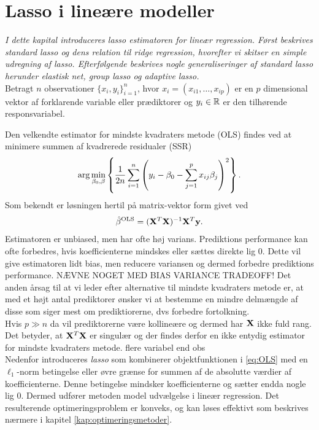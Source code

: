 \chapter{Lasso i lineære modeller}
\textit{I dette kapital introduceres lasso estimatoren for lineær regression. 
Først beskrives standard lasso og dens relation til ridge regression, hvorefter vi skitser en simple udregning af lasso.
Efterfølgende beskrives nogle generaliseringer af standard lasso herunder elastisk net, group lasso og adaptive lasso.} \\[4mm]
%
Betragt \(n\) observationer \(\{x_i, y_i\}_{i=1}^n \), hvor $x_i=(x_{i1}, \ldots, x_{ip})$ er en $p$ dimensional vektor af forklarende variable eller prædiktorer og $y_i \in \mathbb{R}$ er den tilhørende responsvariabel.

Den velkendte estimator for mindste kvadraters metode (OLS) findes ved at minimere summen af kvadrerede residualer (SSR)
\begin{align}
\arg \min_{\beta_0, \beta} \cbr{\frac{1}{2n} \sum_{i=1}^n \del{y_i - \beta_0 - \sum_{j=1}^p x_{ij} \beta_j}^2}. \label{eq:OLS}
\end{align}
Som bekendt er løsningen hertil på matrix-vektor form givet ved
\begin{align*}
\hat{\beta}^{\text{OLS}} = (\mathbf{X}^T \mathbf{X})^{-1} \mathbf{X}^T \mathbf{y}.
\end{align*}
Estimatoren er unbiased, men har ofte høj varians. 
Prediktions performance kan ofte forbedres, hvis koefficienterne mindskes eller sættes direkte lig 0.
Dette vil give estimatoren lidt bias, men reducere variansen og dermed forbedre prediktions performance. NÆVNE NOGET MED BIAS VARIANCE TRADEOFF!
Det anden årsag til at vi leder efter alternative til mindste kvadraters metode er, at med et højt antal prediktorer ønsker vi at bestemme en mindre delmængde af disse som siger mest om prediktiorerne, dvs forbedre fortolkning.\\[4mm]

Hvis \(p \gg n\) da vil prediktorerne være kollineære og dermed har \(\mathbf{X}\) ikke fuld rang.
Det betyder, at $\mathbf{X}^T \mathbf{X}$ er singulær og der findes derfor en ikke entydig estimator for mindste kvadraters metode.
flere variabel end obs \\[4mm]
%
Nedenfor introduceres \textit{lasso} som kombinerer objektfunktionen i \eqref{eq:OLS} med en $\ell_1$-norm betingelse eller øvre grænse for summen af de absolutte værdier af koefficienterne.
Denne betingelse mindsker koefficienterne og sætter endda nogle lig 0. 
Dermed udfører metoden model udvælgelse i lineær regression.
Det resulterende optimeringsproblem er konveks, og kan løses effektivt som beskrives nærmere i kapitel \ref{kap:optimeringsmetoder}.


